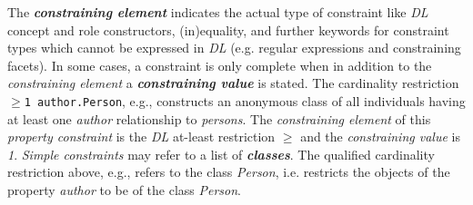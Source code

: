 \documentclass{llncs}
\newcommand{\ms}[1]{\texttt{#1}}
\begin{document}
The \textbf{\emph{constraining element}} indicates the actual type of constraint like \emph{DL} concept and role constructors, (in)equality, and further keywords for constraint types which cannot be expressed in \emph{DL} (e.g. regular expressions and constraining facets).
In some cases, a constraint is only complete when in addition to the \emph{constraining element} a \textbf{\emph{constraining value}} is stated.
The cardinality restriction 
\ms{$\geq$1 author.Person}, e.g., 
constructs an anonymous class of all individuals having at least one \emph{author} relationship to \emph{persons}.
The \emph{constraining element} of this \emph{property constraint} is the \emph{DL} at-least restriction \emph{$\geq$} and the \emph{constraining value} is \emph{1}.
\emph{Simple constraints} may refer to a list of \textbf{\emph{classes}}.
The qualified cardinality restriction above, e.g., refers to the class \emph{Person}, 
i.e. restricts the objects of the property \emph{author} to be of the class \emph{Person}.
\end{document}
